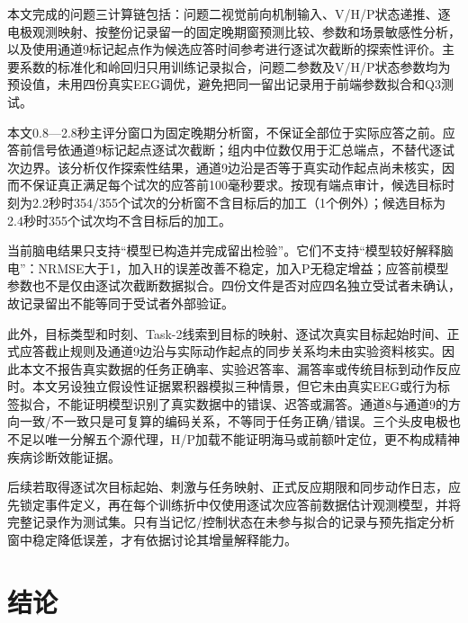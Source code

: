 \documentclass[UTF8,12pt,a4paper,fontset=windows]{ctexart}
\begin{document}
本文完成的问题三计算链包括：问题二视觉前向机制输入、V/H/P状态递推、逐电极观测映射、按整份记录留一的固定晚期窗预测比较、参数和场景敏感性分析，以及使用通道9标记起点作为候选应答时间参考进行逐试次截断的探索性评价。主要系数的标准化和岭回归只用训练记录拟合，问题二参数及V/H/P状态参数均为预设值，未用四份真实EEG调优，避免把同一留出记录用于前端参数拟合和Q3测试。

本文0.8—2.8秒主评分窗口为固定晚期分析窗，不保证全部位于实际应答之前。应答前信号依通道9标记起点逐试次截断；组内中位数仅用于汇总端点，不替代逐试次边界。该分析仅作探索性结果，通道9边沿是否等于真实动作起点尚未核实，因而不保证真正满足每个试次的应答前100毫秒要求。按现有端点审计，候选目标时刻为2.2秒时354/355个试次的分析窗不含目标后的加工（1个例外）；候选目标为2.4秒时355个试次均不含目标后的加工。

当前脑电结果只支持``模型已构造并完成留出检验''。它们不支持``模型较好解释脑电''：NRMSE大于1，加入H的误差改善不稳定，加入P无稳定增益；应答前模型参数也不是仅由逐试次截断数据拟合。四份文件是否对应四名独立受试者未确认，故记录留出不能等同于受试者外部验证。

此外，目标类型和时刻、Task-2线索到目标的映射、逐试次真实目标起始时间、正式应答截止规则及通道9边沿与实际动作起点的同步关系均未由实验资料核实。因此本文不报告真实数据的任务正确率、实验迟答率、漏答率或传统目标到动作反应时。本文另设独立假设性证据累积器模拟三种情景，但它未由真实EEG或行为标签拟合，不能证明模型识别了真实数据中的错误、迟答或漏答。通道8与通道9的方向一致/不一致只是可复算的编码关系，不等同于任务正确/错误。三个头皮电极也不足以唯一分解五个源代理，H/P加载不能证明海马或前额叶定位，更不构成精神疾病诊断效能证据。

后续若取得逐试次目标起始、刺激与任务映射、正式反应期限和同步动作日志，应先锁定事件定义，再在每个训练折中仅使用逐试次应答前数据估计观测模型，并将完整记录作为测试集。只有当记忆/控制状态在未参与拟合的记录与预先指定分析窗中稳定降低误差，才有依据讨论其增量解释能力。

\hypertarget{ux7ed3ux8bba}{%
\section{结论}\label{ux7ed3ux8bba}}
\end{document}
